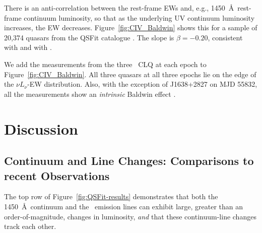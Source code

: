 \documentclass[fleqn,usenatbib]{mnras}
\begin{document}
There is an anti-correlation between the rest-frame EWs and, e.g.,
1450~\AA\ rest-frame continuum luminosity, so that as the underlying
UV continuum luminosity increases, the EW decreases.
Figure~\ref{fig:CIV_Baldwin} shows this for a sample of 20,374 quasars
from the QSFit catalogue \citep{Calderone2017}.  The slope is $\beta=
-0.20$, consistent with \citet[][ $\beta=-0.25$, but for bolometric
luminosity rather than rest-frame UV continuum luminosity]
{Kozlowski2017} and with \citet[][ $\beta=-0.23$]{Hamann2017}.

We add the measurements from the three \civ\ CLQ at each epoch
to Figure~\ref{fig:CIV_Baldwin}. All three quasars at all three epochs
lie on the edge of the $\nu L_{\nu}$-EW distribution.  Also, with the
exception of J1638+2827 on MJD 55832, all the measurements show an
{\it intrinsic} Baldwin effect \citep[e.g.,][]{Goad2004, Rakic2017}.



\section{Discussion}
\subsection{Continuum and Line Changes: Comparisons to recent Observations}
The top row of Figure~\ref{fig:QSFit-results} demonstrates that both
the 1450~\AA\ continuum and the \civ\ emission lines can exhibit
large, greater than an order-of-magnitude, changes in luminosity, {\it
and} that these continuum-line changes track each other.
\end{document}
